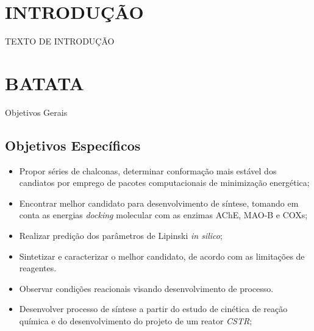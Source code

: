 \chapter{INTRODUÇÃO}

TEXTO DE INTRODUÇÃO

\chapter{BATATA}
Objetivos Gerais
\section{Objetivos Específicos}
\begin{itemize}
    \item Propor séries de chalconas, determinar conformação mais estável dos candiatos por emprego de pacotes computacionais de minimização energética;
    \item Encontrar melhor candidato para desenvolvimento de síntese, tomando em conta as energias \textit{docking} molecular com as enzimas AChE, MAO-B e COXs;
    \item Realizar predição dos parâmetros de Lipinski \textit{in silico};
    \item Sintetizar e caracterizar o melhor candidato, de acordo com as limitações de reagentes.
    \item Observar condições reacionais visando desenvolvimento de processo.
    \item Desenvolver processo de síntese a partir do estudo de cinética de reação química e do desenvolvimento do projeto de um reator \textit{CSTR};
\end{itemize}